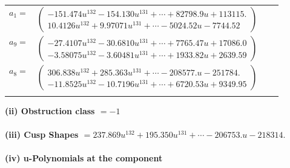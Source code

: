 \documentclass[1p]{elsarticle_modified}
\theoremstyle{definition}
\begin{document}
\begin{tabular}{m{7pt} m{180pt} m{7pt} m{180pt} }
\flushright $a_{1}=$&$\begin{pmatrix}-151.474 u^{132}-154.130 u^{131}+\cdots+82798.9 u+113115.\\10.4126 u^{132}+9.97071 u^{131}+\cdots-5024.52 u-7744.52\end{pmatrix}$ \\
\flushright $a_{9}=$&$\begin{pmatrix}-27.4107 u^{132}-30.6810 u^{131}+\cdots+7765.47 u+17086.0\\-3.58075 u^{132}-3.60481 u^{131}+\cdots+1933.82 u+2639.59\end{pmatrix}$ \\
\flushright $a_{8}=$&$\begin{pmatrix}306.838 u^{132}+285.363 u^{131}+\cdots-208577. u-251784.\\-11.8525 u^{132}-10.7196 u^{131}+\cdots+6720.53 u+9349.95\end{pmatrix}$\\&\end{tabular}
\flushleft \textbf{(ii) Obstruction class $= -1$}\\~\\
\flushleft \textbf{(iii) Cusp Shapes $= 237.869 u^{132}+195.350 u^{131}+\cdots-206753. u-218314.$}\\~\\
\newpage\renewcommand{\arraystretch}{1}
\flushleft \textbf{(iv) u-Polynomials at the component}\newline \\
\end{document}
